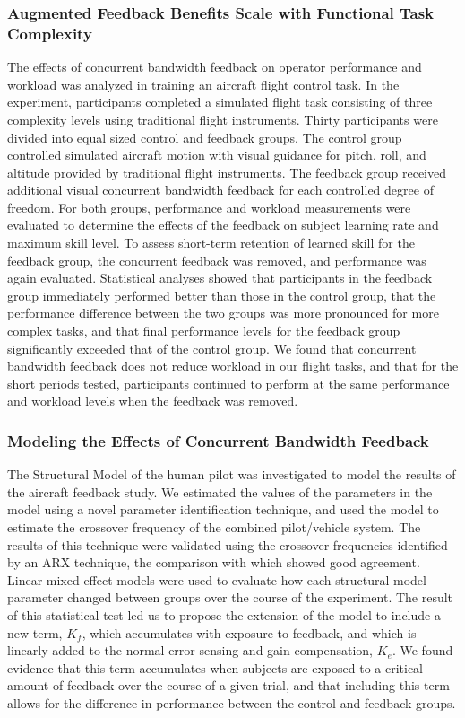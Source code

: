 \subsubsection{Augmented Feedback Benefits Scale with Functional Task Complexity}
The effects of concurrent bandwidth feedback on operator performance and workload was analyzed in training an aircraft flight control task.
In the experiment, participants completed a simulated flight task consisting of three complexity levels using traditional flight instruments.
Thirty participants were divided into equal sized control and feedback groups.
The control group controlled simulated aircraft motion with visual guidance for pitch, roll, and altitude provided by traditional flight instruments.
The feedback group received additional visual concurrent bandwidth feedback for each controlled degree of freedom.
For both groups, performance and workload measurements were evaluated to determine the effects of the feedback on subject learning rate and maximum skill level.
To assess short-term retention of learned skill for the feedback group, the concurrent feedback was removed, and performance was again evaluated.
Statistical analyses showed that participants in the feedback group immediately performed better than those in the control group, that the performance difference between the two groups was more pronounced for more complex tasks, and that final performance levels for the feedback group significantly exceeded that of the control group.
We found that concurrent bandwidth feedback does not reduce workload in our flight tasks, and that for the short periods tested, participants continued to perform at the same performance and workload levels when the feedback was removed.

\subsubsection{Modeling the Effects of Concurrent Bandwidth Feedback}
The Structural Model of the human pilot was investigated to model the results of the aircraft feedback study.
We estimated the values of the parameters in the model using a novel parameter identification technique, and used the model to estimate the crossover frequency of the combined pilot/vehicle system.
The results of this technique were validated using the crossover frequencies identified by an ARX technique, the comparison with which showed good agreement.
Linear mixed effect models were used to evaluate how each structural model parameter changed between groups over the course of the experiment.
The result of this statistical test led us to propose the extension of the model to include a new term, $K_f$, which accumulates with exposure to feedback, and which is linearly added to the normal error sensing and gain compensation, $K_e$.
We found evidence that this term accumulates when subjects are exposed to a critical amount of feedback over the course of a given trial, and that including this term allows for the difference in performance between the control and feedback groups.

